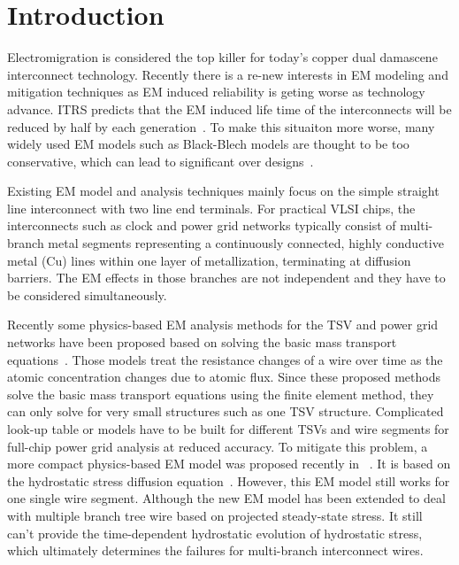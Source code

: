 \section{Introduction}
\label{sec:intro}

Electromigration is considered the top killer for today's copper dual
damascene interconnect technology. Recently there is a re-new
interests in EM modeling and mitigation techniques as EM induced
reliability is geting worse as technology advance.  ITRS predicts that
the EM induced life time of the interconnects will be reduced by half
by each generation~\cite{ITRS}. To make this situaiton more worse,
many widely used EM models such as Black-Blech models are thought to
be too conservative, which can lead to significant over
designs~\cite{Bailey:semieng}.

Existing EM model and analysis techniques mainly focus on the simple
straight line interconnect with two line end terminals. For practical
VLSI chips, the interconnects such as clock and power grid networks
typically consist of multi-branch metal segments representing a
continuously connected, highly conductive metal (Cu) lines within one
layer of metallization, terminating at diffusion barriers. The EM
effects in those branches are not independent and they have to be
considered simultaneously.

Recently some physics-based EM analysis methods for the TSV and power
grid networks have been proposed based on solving the basic mass
transport
equations~\cite{Pak:2011cx,Pathak:2011kz,Zhao:2013cv,Pak:2013bh}.
Those models treat the resistance changes of a wire over time as the
atomic concentration changes due to atomic flux. Since these proposed
methods solve the basic mass transport equations using the finite
element method, they can only solve for very small structures such as
one TSV structure. Complicated look-up table or models have to be
built for different TSVs and wire segments for full-chip power grid
analysis at reduced accuracy. To mitigate this problem, a more compact
physics-based EM model was proposed recently in
~\cite{HuangYu:DAC'14}. It is based on the hydrostatic stress
diffusion equation~\cite{Korhonen:jap1993}. However, this EM model
still works for one single wire segment. Although the new EM model has
been extended to deal with multiple branch tree wire based on
projected steady-state stress.  It still can't provide the
time-dependent hydrostatic evolution of hydrostatic stress, which
ultimately determines the failures for multi-branch interconnect
wires. 

